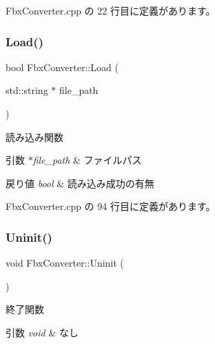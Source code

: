  Fbx\+Converter.\+cpp の 22 行目に定義があります。

\mbox{\label{class_fbx_converter_a5259c5ec8f57b412455d75ccebb27524}} 
\subsubsection{\texorpdfstring{Load()}{Load()}}
{\footnotesize\ttfamily bool Fbx\+Converter\+::\+Load (\begin{DoxyParamCaption}\item[{std\+::string $\ast$}]{file\+\_\+path }\end{DoxyParamCaption})\hspace{0.3cm}{\ttfamily [private]}}



読み込み関数 


\begin{DoxyParams}{引数}
{\em $\ast$file\+\_\+path} & ファイルパス \\
\hline
\end{DoxyParams}

\begin{DoxyRetVals}{戻り値}
{\em bool} & 読み込み成功の有無 \\
\hline
\end{DoxyRetVals}


 Fbx\+Converter.\+cpp の 94 行目に定義があります。

\mbox{\label{class_fbx_converter_ab41f9b165cb34a294bb2c5da778f542b}} 
\subsubsection{\texorpdfstring{Uninit()}{Uninit()}}
{\footnotesize\ttfamily void Fbx\+Converter\+::\+Uninit (\begin{DoxyParamCaption}{ }\end{DoxyParamCaption})}



終了関数 


\begin{DoxyParams}{引数}
{\em void} & なし \\
\hline
\end{DoxyParams}

